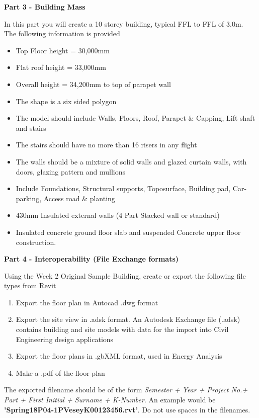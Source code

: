 \newpage
\begin{flushleft}
	\large\textbf{Part 3 - Building Mass}\\
\end{flushleft}
In this part you will create a 10 storey building, typical FFL to FFL of 3.0m. The following information is provided
\begin{itemize}
	\item Top Floor height = 30,000mm
	\item Flat roof height = 33,000mm
	\item Overall height = 34,200mm to top of parapet wall
	\item The shape is a six sided polygon
	\item The model should include Walls, Floors, Roof, Parapet \& Capping, Lift shaft and stairs
	\item The stairs should have no more than 16 risers in any flight
	\item The walls should be a mixture of solid walls and glazed curtain walls, with doors, glazing pattern and mullions
	\item Include Foundations, Structural supports, Toposurface, Building pad, Car-parking, Access road \& planting
	\item 430mm Insulated external walls (4 Part Stacked wall or standard)
	\item Insulated concrete ground floor slab and suspended Concrete upper floor construction.
\end{itemize}



\newpage
\begin{flushleft}
	\large\textbf{Part 4 - Interoperability (File Exchange formats)}\\
\end{flushleft}
Using the Week 2 Original Sample Building, create or export the following file types from Revit
\begin{enumerate}
	\item Export the floor plan in Autocad .dwg format
	\item Export the site view in .adsk format.  An Autodesk Exchange file (.adsk) contains building and site models with data for the import into Civil Engineering design applications
	\item Export the floor plans in .gbXML format, used in Energy Analysis
	\item Make a .pdf of the floor plan
\end{enumerate}
The exported filename should be of the form \textit{Semester  + Year + Project No.+ Part + First Initial + Surname + K-Number}. An example would be \textbf{'Spring18P04-1PVeseyK00123456.rvt'}.  Do not use spaces in the filenames.





